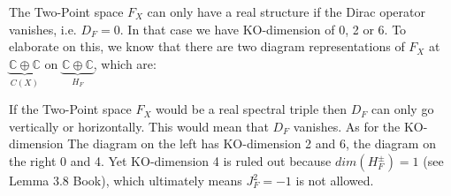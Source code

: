     The Two-Point space $F_X$ can only have a real structure if the Dirac
    operator vanishes, i.e. $D_F = 0$. In that case we have KO-dimension of 0,
    2 or 6. To elaborate on this, we know that there are two diagram representations of
    $F_X$ at $\underbrace{\mathbb{C} \oplus \mathbb{C}}_{C(X)}$ on
    $\underbrace{\mathbb{C} \oplus\mathbb{C}}_{H_F}$, which are:
    \begin{figure}[h!] \centering
    \end{figure}\newline
If the Two-Point space $F_X$ would be a real spectral triple then $D_F$ can
only go vertically or horizontally. This would mean that $D_F$ vanishes.
As for the KO-dimension The diagram on the left has KO-dimension 2 and 6, the diagram on the
right 0 and 4. Yet KO-dimension 4 is ruled out because
$dim(H_F^\pm) = 1$ (see Lemma 3.8 Book), which ultimately means $J_F^2 = -1$ is
not allowed.
